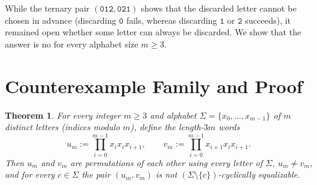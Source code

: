 \documentclass[11pt]{article}
\newtheorem{theorem}{Theorem}
\begin{document}
While the ternary pair $(\texttt{012}, \texttt{021})$ shows that the discarded
letter cannot be chosen in advance (discarding $\texttt{0}$ fails, whereas
discarding $\texttt{1}$ or $\texttt{2}$ succeeds), it remained open whether
some letter can always be discarded. We show that the answer is no for every
alphabet size $m \ge 3$.

\section{Counterexample Family and Proof}

\begin{theorem}\label{thm:main}
For every integer $m \ge 3$ and alphabet $\Sigma = \{x_0, \dots, x_{m-1}\}$ of
$m$ distinct letters (indices modulo $m$), define the length-$3m$ words
\[
u_m := \prod_{i=0}^{m-1} x_i x_i x_{i+1}, \qquad
v_m := \prod_{i=0}^{m-1} x_{i+1} x_i x_{i+1}.
\]
Then $u_m$ and $v_m$ are permutations of each other using every letter of
$\Sigma$, $u_m \ne v_m$, and for every $c \in \Sigma$ the pair $(u_m, v_m)$ is
not $(\Sigma \setminus \{c\})$-cyclically equalizable.
\end{theorem}
\end{document}

